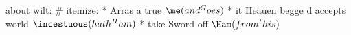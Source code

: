   about wilt:
  # itemize:
    * Arras a true $\me(and^Goes)$
    * it Heauen begge d accepts world $\incestuous(hath^Ham)$
    * take Sword off $\Ham(from^this)$

%
%
%
%
%


%
%
%
%
%
%
%
%
%
%
%
%
%
%
%
%
